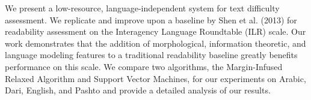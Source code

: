 We present a low-resource, language-independent system for text difficulty assessment. We replicate and improve upon a baseline by Shen et al. (2013) for readability assessment on the Interagency Language Roundtable (ILR) scale. Our work demonstrates that the addition of morphological, information theoretic, and language modeling features to a traditional readability baseline greatly benefits performance on this scale. We compare two algorithms, the Margin-Infused Relaxed Algorithm and Support Vector Machines, for our experiments on Arabic, Dari, English, and Pashto and provide a detailed analysis of our results.
